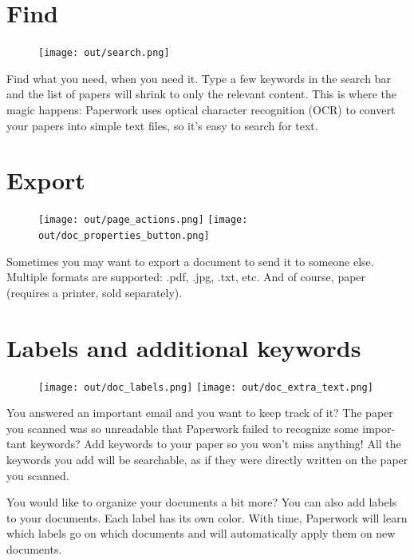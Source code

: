 \documentclass[10pt,a4paper]{article}
\begin{document}
\section{Find}

\begin{figure}
	\centering
	\vspace{-20pt}
	\texttt{[image: out/search.png]}
\end{figure}

Find what you need, when you need it. Type a few keywords in the search
bar and the list of papers will shrink to only the relevant content. This
is where the magic happens: Paperwork uses optical character recognition
(OCR) to convert your papers into simple text files, so it's easy to
search for text.


\section{Export}

\begin{figure}[h]
	\centering
	\texttt{[image: out/page\_actions.png]}
	\texttt{[image: out/doc\_properties\_button.png]}
\end{figure}

Sometimes you may want to export a document to send it to someone else.
Multiple formats are supported: .pdf, .jpg, .txt, etc. And of course, paper
(requires a printer, sold separately).


\section{Labels and additional keywords}

\begin{figure}[h]
	\centering
	\texttt{[image: out/doc\_labels.png]}
	\texttt{[image: out/doc\_extra\_text.png]}
\end{figure}

You answered an important email and you want to keep track of it? The paper
you scanned was so unreadable that Paperwork failed to recognize some impor-
tant keywords? Add keywords to your paper so you won't miss anything! All
the keywords you add will be searchable, as if they were directly written on
the paper you scanned.

You would like to organize your documents a bit more? You can also add labels
to your documents. Each label has its own color. With time, Paperwork will
learn which labels go on which documents and will automatically apply them
on new documents.
\end{document}
